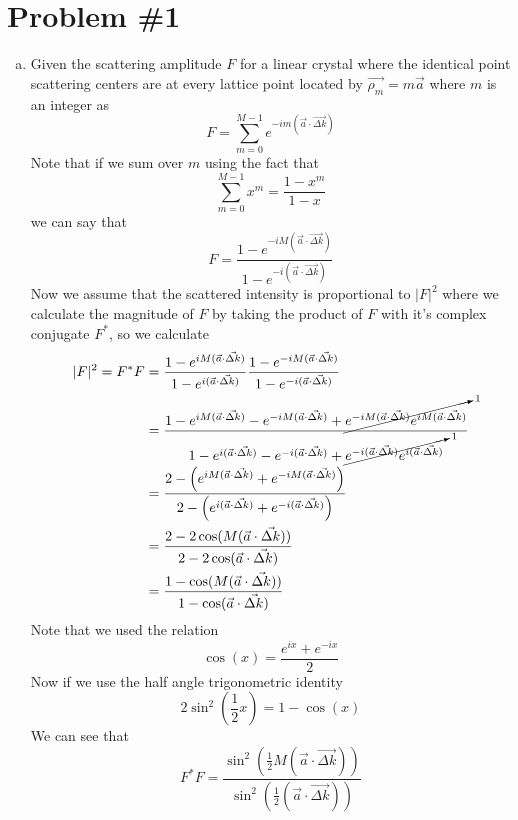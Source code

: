 \documentclass[11pt]{article}
\numberwithin{equation}{section}
\begin{document}


\section{Problem \#1}
\begin{enumerate}[(a)]
\item
Given the scattering amplitude $F$ for a linear crystal where the identical point scattering centers are at every lattice point located by $\vec{\rho_m} = m\vec{a}$ where $m$ is an integer as
$$F = \sum_{m=0}^{M-1}e^{-im(\vec{a}\cdot\vec{\Delta k})}$$
Note that if we sum over $m$ using the fact that
$$\sum_{m=0}^{M-1}x^m = \frac{1-x^m}{1-x}$$
we can say that
$$F = \frac{1-e^{-iM(\vec{a}\cdot\vec{\Delta k})}}{1-e^{-i(\vec{a}\cdot\vec{\Delta k})}}$$
Now we assume that the scattered intensity is proportional to $|F|^2$ where we calculate the magnitude of $F$ by taking the product of $F$ with it's complex conjugate $F^*$, so we calculate
\begin{align*}
|F|^2 = F^*F &=\frac{1-e^{iM(\vec{a}\cdot\vec{\Delta k})}}{1-e^{i(\vec{a}\cdot\vec{\Delta k})}} \frac{1-e^{-iM(\vec{a}\cdot\vec{\Delta k})}}{1-e^{-i(\vec{a}\cdot\vec{\Delta k})}}\\
&=\frac{1-e^{iM(\vec{a}\cdot\vec{\Delta k})}-e^{-iM(\vec{a}\cdot\vec{\Delta k})} + \cancelto{1}{e^{-iM(\vec{a}\cdot\vec{\Delta k})}e^{iM(\vec{a}\cdot\vec{\Delta k})}}}{1-e^{i(\vec{a}\cdot\vec{\Delta k})}-e^{-i(\vec{a}\cdot\vec{\Delta k})} + \cancelto{1}{e^{-i(\vec{a}\cdot\vec{\Delta k})}e^{i(\vec{a}\cdot\vec{\Delta k})}}}\\
&=\frac{2-\left(e^{iM(\vec{a}\cdot\vec{\Delta k})}+e^{-iM(\vec{a}\cdot\vec{\Delta k})}\right) }{2-\left(e^{i(\vec{a}\cdot\vec{\Delta k})}+e^{-i(\vec{a}\cdot\vec{\Delta k})}\right)}\\
&=\frac{2-2\cos(M(\vec{a}\cdot\vec{\Delta k}))}{2-2\cos(\vec{a}\cdot\vec{\Delta k})}\\
&=\frac{1-\cos(M(\vec{a}\cdot\vec{\Delta k}))}{1-\cos(\vec{a}\cdot\vec{\Delta k})}
\end{align*}
Note that we used the relation 
$$\cos(x) = \frac{e^{ix}+e^{-ix}}{2}$$
Now if we use the half angle trigonometric identity 
$$2\sin^2\left(\frac{1}{2}x\right) = 1-\cos(x)$$
We can see that
$$F^*F =\frac{\sin^2\left(\frac{1}{2}M(\vec{a}\cdot\vec{\Delta k})\right)}{\sin^2\left(\frac{1}{2}(\vec{a}\cdot\vec{\Delta k})\right)}$$


\end{enumerate}
\end{document}
